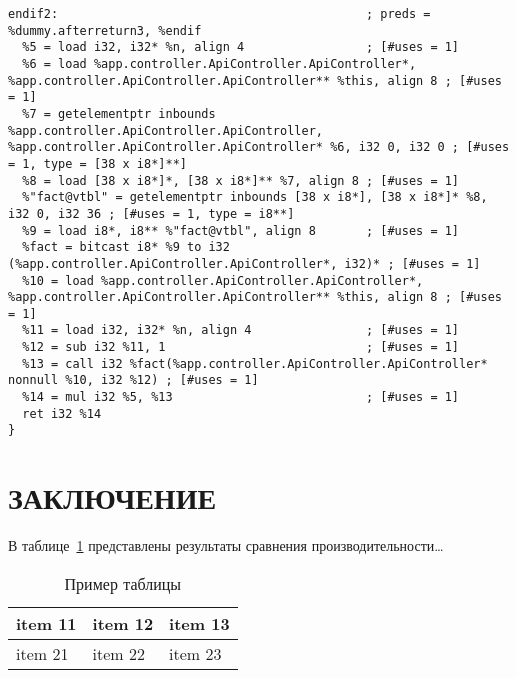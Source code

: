 \documentclass{studrep}
\begin{document}
\begin{listing}[H]
\begin{verbatim}
endif2:                                           ; preds = %dummy.afterreturn3, %endif
  %5 = load i32, i32* %n, align 4                 ; [#uses = 1]
  %6 = load %app.controller.ApiController.ApiController*, %app.controller.ApiController.ApiController** %this, align 8 ; [#uses = 1]
  %7 = getelementptr inbounds %app.controller.ApiController.ApiController, %app.controller.ApiController.ApiController* %6, i32 0, i32 0 ; [#uses = 1, type = [38 x i8*]**]
  %8 = load [38 x i8*]*, [38 x i8*]** %7, align 8 ; [#uses = 1]
  %"fact@vtbl" = getelementptr inbounds [38 x i8*], [38 x i8*]* %8, i32 0, i32 36 ; [#uses = 1, type = i8**]
  %9 = load i8*, i8** %"fact@vtbl", align 8       ; [#uses = 1]
  %fact = bitcast i8* %9 to i32 (%app.controller.ApiController.ApiController*, i32)* ; [#uses = 1]
  %10 = load %app.controller.ApiController.ApiController*, %app.controller.ApiController.ApiController** %this, align 8 ; [#uses = 1]
  %11 = load i32, i32* %n, align 4                ; [#uses = 1]
  %12 = sub i32 %11, 1                            ; [#uses = 1]
  %13 = call i32 %fact(%app.controller.ApiController.ApiController* nonnull %10, i32 %12) ; [#uses = 1]
  %14 = mul i32 %5, %13                           ; [#uses = 1]
  ret i32 %14
}
\end{verbatim}
\end{listing}


\chapter*{ЗАКЛЮЧЕНИЕ}

В таблице~\ref{tbl:ex} представлены результаты сравнения производительности\ldots

\begin{table}[hb]
  \caption{Пример таблицы}\label{tbl:ex}
  \centering
\begin{tabularx}{1\textwidth} {
  | >{\raggedright\arraybackslash}X
  | >{\centering\arraybackslash}X
  | >{\raggedleft\arraybackslash}X | }
 \hline
 item 11 & item 12 & item 13 \\
 \hline
 item 21  & item 22  & item 23  \\
\hline
\end{tabularx}
\end{table}
\end{document}
